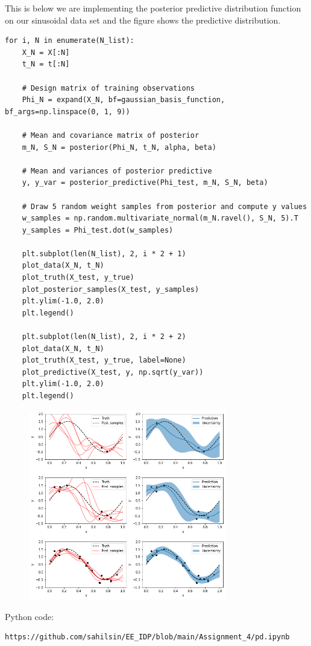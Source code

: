 \documentclass[journal,12pt,twocolumn]{IEEEtran}
\begin{document}
This is below we are implementing the posterior predictive distribution function on our sinusoidal data set and the figure shows the predictive distribution. 
\begin{lstlisting}
for i, N in enumerate(N_list):
    X_N = X[:N]
    t_N = t[:N]

    # Design matrix of training observations
    Phi_N = expand(X_N, bf=gaussian_basis_function, bf_args=np.linspace(0, 1, 9))

    # Mean and covariance matrix of posterior
    m_N, S_N = posterior(Phi_N, t_N, alpha, beta)
    
    # Mean and variances of posterior predictive 
    y, y_var = posterior_predictive(Phi_test, m_N, S_N, beta)
    
    # Draw 5 random weight samples from posterior and compute y values
    w_samples = np.random.multivariate_normal(m_N.ravel(), S_N, 5).T
    y_samples = Phi_test.dot(w_samples)
    
    plt.subplot(len(N_list), 2, i * 2 + 1)
    plot_data(X_N, t_N)
    plot_truth(X_test, y_true)
    plot_posterior_samples(X_test, y_samples)
    plt.ylim(-1.0, 2.0)
    plt.legend()
    
    plt.subplot(len(N_list), 2, i * 2 + 2)
    plot_data(X_N, t_N)
    plot_truth(X_test, y_true, label=None)
    plot_predictive(X_test, y, np.sqrt(y_var))
    plt.ylim(-1.0, 2.0)
    plt.legend()

\end{lstlisting}
\begin{figure}[!h]
\begin{center}
\includegraphics[width=3.4in]{figs/x3.png}
\end{center}
\caption{}
\label{fig:2}
\end{figure}
Python code:
\begin{lstlisting}
https://github.com/sahilsin/EE_IDP/blob/main/Assignment_4/pd.ipynb
\end{lstlisting}
\end{document}
